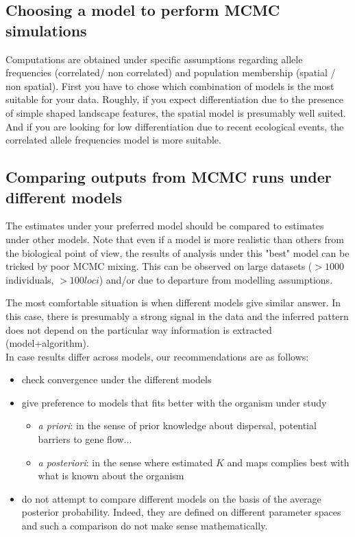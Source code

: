 \documentclass{article}
\begin{document}
\subsection{Choosing a model to perform MCMC simulations}

Computations are obtained under specific assumptions regarding allele frequencies (correlated/ non correlated) 
and population membership (spatial / non spatial). 
First you have to chose which combination of models is the most suitable for your data.
Roughly, if you expect differentiation due to the presence of simple shaped landscape features, the spatial model is presumably well suited. 
And if you are looking for low differentiation due to recent ecological events, the correlated allele frequencies model 
is more suitable. 

\subsection{Comparing outputs from MCMC runs under different models}

The estimates under your preferred model should be compared to estimates under other models. 
Note that even if a model is more realistic than others from the biological point of view, the results of analysis under this 
"best" model can be tricked by poor 
MCMC mixing. This can be    observed on large datasets ($> 1000$ individuals, $>100 loci$) and/or due to departure from modelling assumptions.


The most comfortable situation is when different models give similar answer. In this case, there is presumably a strong signal in the data 
and the inferred pattern does not depend on the particular way information is extracted (model+algorithm). \\
In case results differ across models, our recommendations are as follows:
\begin{itemize}
\item check convergence under the different models
\item give preference to models that fits better with the organism under study
  \begin{itemize}
  \item {\em a priori}: in the sense of prior knowledge about dispersal, potential barriers to gene flow...
  \item {\em a posteriori}: in the sense where estimated $K$ and maps complies best with what is known about the organism
  \end{itemize}
\item do not attempt to compare different models  on the basis of the average posterior probability. 
Indeed, they are defined on different parameter spaces and such a comparison do not make sense mathematically. 
\end{itemize}
\end{document}
